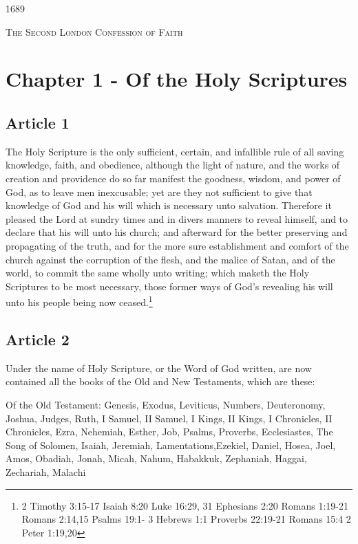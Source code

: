 \documentclass[12pt,letterpaper]{book}
\begin{document}
\begin{titlepage}
    \centering
    {\scshape\Large 1689 \par}
    \vspace{0.5cm}
    {\scshape\LARGE The Second London Confession of Faith \par}
    \vspace{0.5cm}
    \vfill
\end{titlepage}

\chapter{Chapter 1 - Of the Holy Scriptures}
\section{Article 1}

The Holy Scripture is the only sufficient, certain, and infallible rule of all saving knowledge, faith, and obedience, although the light of nature, and the works of creation and providence do so far manifest the goodness, wisdom, and power of God, as to leave men inexcusable; yet are they not sufficient to give that knowledge of God and his will which is necessary unto salvation. Therefore it pleased the Lord at sundry times and in divers manners to reveal himself, and to declare that his will unto his church; and afterward for the better preserving and propagating of the truth, and for the more sure establishment and comfort of the church against the corruption of the flesh, and the malice of Satan, and of the world, to commit the same wholly unto writing; which maketh the Holy Scriptures to be most necessary, those former ways of God's revealing his will unto his people being now ceased.\footnote{2 Timothy 3:15-17 Isaiah 8:20 Luke 16:29, 31 Ephesians 2:20 Romans 1:19-21 Romans 2:14,15 Psalms 19:1- 3 Hebrews 1:1 Proverbs 22:19-21 Romans 15:4 2 Peter 1:19,20}

\section{Article 2}

Under the name of Holy Scripture, or the Word of God written, are now contained all the books of the Old and New Testaments, which are these:

Of the Old Testament: Genesis, Exodus, Leviticus, Numbers, Deuteronomy, Joshua, Judges, Ruth, I Samuel, II Samuel, I Kings, II Kings, I Chronicles, II Chronicles, Ezra, Nehemiah, Esther, Job, Psalms, Proverbs, Ecclesiastes, The Song of Solomen, Isaiah, Jeremiah, Lamentations,Ezekiel, Daniel, Hosea, Joel, Amos, Obadiah, Jonah, Micah, Nahum, Habakkuk, Zephaniah, Haggai, Zechariah, Malachi
\end{document}
